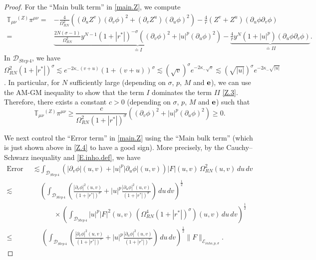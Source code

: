 \documentclass[10pt, reqno]{amsart}
\theoremstyle{definition}
\theoremstyle{remark}
\numberwithin{equation}{section}
\def\ls{\lesssim}
\newcommand{\rd}{\partial}
\newcommand{\0}{\emptyset}
\newcommand{\Omg}{\Omega}
\newcommand{\f}{\frac}
\begin{document}
\begin{proof}
For the ``Main bulk term'' in \eqref{main.Z}, we compute
\begin{equation}\label{Z.3}
\begin{split}
\mathbb T_{\mu\nu}{ }^{(Z)}\pi^{\mu\nu}=&-\f{4}{\Omg_{RN}^2}\left((\rd_uZ^v)(\rd_v\phi)^2+(\rd_v Z^u)(\rd_u\phi)^2\right)-\f{4}{r} (Z^v+Z^u)(\rd_u\phi\rd_v\phi)\\
=&\underbrace{\f{2 N(\sigma-1)}{\Omg_{RN}^2}y^{N-1}(1+|r^*|)^{-\sigma}\left((\rd_v\phi)^2+|u|^{p}(\rd_u\phi)^2\right)}_{\doteq I}-\underbrace{\f{4}{r} y^{N} (1+|u|^{p})(\rd_u\phi\rd_v\phi)}_{\doteq II}.
\end{split}
\end{equation}
In $\mathcal D_{Step\,4}$, we have $\Omg_{RN}^2(1+|r^*|)^{\sigma}\ls e^{-2\kappa_-(v+u)}(1+(v+u))^{\sigma}\ls (\sqrt{v})^\sigma e^{-2\kappa_-\sqrt{v}}\ls (\sqrt{|u|})^{\sigma} e^{-2\kappa_-\sqrt{|u|}}$. In particular, for $N$ sufficiently large (depending on $\sigma$, $p$, $M$ and ${\bf e}$), we can use the AM-GM inequality to show that the term $I$ dominates the term $II$ \eqref{Z.3}. Therefore, there exists a constant $c>0$ (depending on $\sigma$, $p$, $M$ and ${\bf e}$) such that
\begin{equation}\label{Z.4}
\mathbb T_{\mu\nu}{ }^{(Z)}\pi^{\mu\nu}\geq \f{c}{\Omg_{RN}^2(1+|r^*|)^{\sigma}}\left((\rd_v\phi)^2+|u|^{p}(\rd_u\phi)^2\right)\geq 0.
\end{equation}

We next control the ``Error term'' in \eqref{main.Z} using the ``Main bulk term'' (which is just shown above in \eqref{Z.4} to have a good sign). More precisely, by the Cauchy--Schwarz inequality and \eqref{E.inho.def}, we have
\begin{equation}\label{Z.5}
\begin{split}
\mbox{Error term}\ls &\int_{\mathcal D_{Step\,4}}\left(|\rd_v\phi|(u,v)+|u|^{p}|\rd_u\phi|(u,v)\right)|F|(u,v)\,\Omg_{RN}^2(u,v)\,du\,dv\\
\ls & \left(\int_{\mathcal D_{Step\,4}} \left(\f{|\rd_v\phi|^2(u,v)}{(1+|r^*|)^{\sigma}}+|u|^{p}\f{|\rd_u\phi|^2(u,v)}{(1+|r^*|)^{\sigma}}\right)\,du\,dv\right)^{\f 12}\\
&\qquad\times\left(\int_{\mathcal D_{Step\,4}} |u|^{p}|F|^2(u,v)\,(\Omg_{RN}^4(1+|r^*|)^{\sigma})(u,v)\,du\,dv\right)^{\f 12}\\
\leq &\: \left(\int_{\mathcal D_{Step\,4}} \left(\f{|\rd_v\phi|^2(u,v)}{(1+|r^*|)^{\sigma}}+|u|^{p}\f{|\rd_u\phi|^2(u,v)}{(1+|r^*|)^{\sigma}}\right)\,du\,dv\right)^{\f 12} \|F\|_{\mathcal E_{inho,p,\sigma}}.
\end{split}
\end{equation}


\end{proof}
\end{document}
